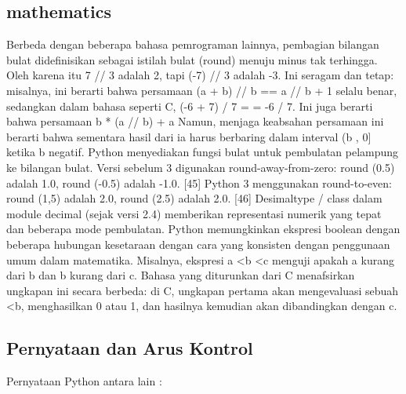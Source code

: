 \subsection {mathematics}
	Berbeda dengan beberapa bahasa pemrograman lainnya, pembagian bilangan bulat didefinisikan sebagai istilah bulat (round) menuju minus tak terhingga. 
	Oleh karena itu 7 // 3 adalah 2, tapi (-7) // 3 adalah -3. Ini seragam dan tetap: misalnya, ini berarti bahwa persamaan (a + b) // b == a // b + 1 selalu benar, 
	sedangkan dalam bahasa seperti C, (-6 + 7) / 7 = = -6 / 7. Ini juga berarti bahwa persamaan b * (a // b) + a%
	Namun, menjaga keabsahan persamaan ini berarti bahwa sementara hasil dari%
	ia harus berbaring dalam interval (b , 0] ketika b negatif.
	Python menyediakan fungsi bulat untuk pembulatan pelampung ke bilangan bulat. Versi sebelum 3 digunakan round-away-from-zero: round (0.5) adalah 1.0, round (-0.5) adalah -1.0. [45] Python 3 menggunakan round-to-even: round (1,5) adalah 2.0, round (2.5) adalah 2.0. [46] Desimaltype / class dalam module decimal (sejak versi 2.4) memberikan representasi numerik yang tepat dan beberapa mode pembulatan.
	Python memungkinkan ekspresi boolean dengan beberapa hubungan kesetaraan dengan cara yang konsisten dengan penggunaan umum dalam matematika. Misalnya, ekspresi a <b <c menguji apakah a kurang dari b dan b kurang dari c. Bahasa yang diturunkan dari C menafsirkan ungkapan ini secara berbeda: di C, ungkapan pertama akan mengevaluasi sebuah <b, menghasilkan 0 atau 1, dan hasilnya kemudian akan dibandingkan dengan c.

\subsection {Pernyataan dan Arus Kontrol}
	Pernyataan Python antara lain :

